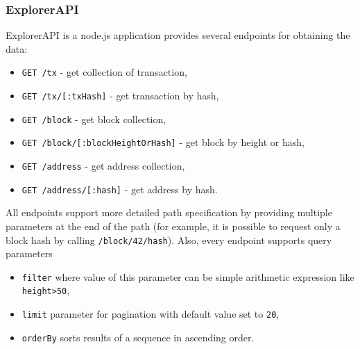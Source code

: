 \subsubsection{ExplorerAPI}
\label{explorerAPIroutes}
ExplorerAPI is a node.js application provides several endpoints for obtaining the data:
\begin{itemize}
    \item \texttt{GET /tx} - get collection of transaction, 
    \item \texttt{GET /tx/[:txHash]} - get transaction by hash,
    \item \texttt{GET /block} - get block collection,
    \item \texttt{GET /block/[:blockHeightOrHash]} - get block by height or hash,
    \item \texttt{GET /address} - get address collection,
    \item \texttt{GET /address/[:hash]} - get address by hash.
\end{itemize}
All endpoints support more detailed path specification by providing multiple parameters at the end of the path (for example, it is possible to request only a block hash by calling \texttt{/block/42/hash}). Also, every endpoint supports query parameters
\begin{itemize}
    \item \texttt{filter} where value of this parameter can be simple arithmetic expression like \texttt{height>50},
    \item \texttt{limit} parameter for pagination with default value set to \texttt{20},
    \item \texttt{orderBy} sorts results of a sequence in ascending order.
\end{itemize}
 



